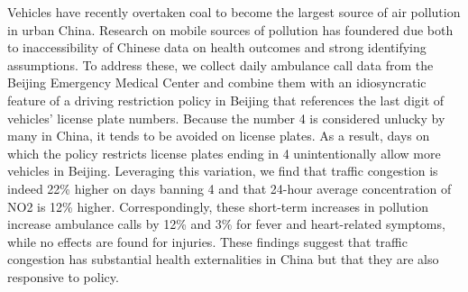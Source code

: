 Vehicles have recently overtaken coal to become the largest source of air pollution in urban China. Research on mobile sources of pollution has foundered due both to inaccessibility of Chinese data on health outcomes and strong identifying assumptions. To address these, we collect daily ambulance call data from the Beijing Emergency Medical Center and combine them with an idiosyncratic feature of a driving restriction policy in Beijing that references the last digit of vehicles’ license plate numbers. Because the number 4 is considered unlucky by many in China, it tends to be avoided on license plates. As a result, days on which the policy restricts license plates ending in 4 unintentionally allow more vehicles in Beijing. Leveraging this variation, we find that traffic congestion is indeed 22\% higher on days banning 4 and that 24-hour average concentration of NO2 is 12\% higher. Correspondingly, these short-term increases in pollution increase ambulance calls by 12\% and 3\% for fever and heart-related symptoms, while no effects are found for injuries. These findings suggest that traffic congestion has substantial health externalities in China but that they are also responsive to policy. 
